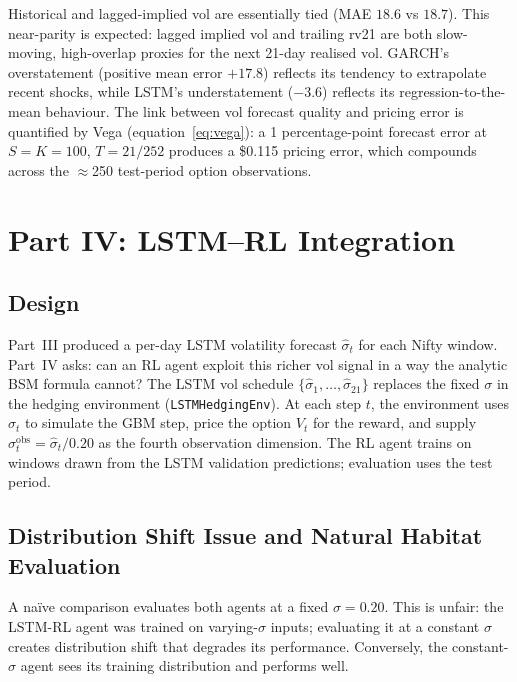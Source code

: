 \documentclass[12pt,a4paper]{article}
\begin{document}
Historical and lagged-implied vol are essentially tied (MAE $18.6$ vs $18.7$).
This near-parity is expected: lagged implied vol and trailing rv21 are both
slow-moving, high-overlap proxies for the next 21-day realised vol.  GARCH's
overstatement (positive mean error $+17.8$) reflects its tendency to
extrapolate recent shocks, while LSTM's understatement ($-3.6$) reflects
its regression-to-the-mean behaviour.  The link between vol forecast quality
and pricing error is quantified by Vega (equation~\eqref{eq:vega}): a
1 percentage-point forecast error at $S=K=100$, $T=21/252$ produces a
\$0.115 pricing error, which compounds across the $\approx$250 test-period
option observations.

\section{Part IV: LSTM--RL Integration}
\label{sec:integration}

\subsection{Design}

Part~III produced a per-day LSTM volatility forecast $\hat\sigma_t$ for each
Nifty window.  Part~IV asks: can an RL agent exploit this richer vol signal in
a way the analytic BSM formula cannot?  The LSTM vol schedule
$\{\hat\sigma_1,\ldots,\hat\sigma_{21}\}$ replaces the
fixed $\sigma$ in the hedging environment (\texttt{LSTMHedgingEnv}).  At each
step $t$, the environment uses $\hat\sigma_t$ to simulate the GBM step,
price the option $V_t$ for the reward, and supply $\sigma_t^{\mathrm{obs}} =
\hat\sigma_t/0.20$ as the fourth observation dimension.  The RL agent trains on
windows drawn from the LSTM validation predictions; evaluation uses the test
period.

\subsection{Distribution Shift Issue and Natural Habitat Evaluation}

A na\"{i}ve comparison evaluates both agents at a fixed $\sigma=0.20$.
This is unfair: the LSTM-RL agent was trained on varying-$\sigma$ inputs;
evaluating it at a constant $\sigma$ creates distribution shift that degrades
its performance.  Conversely, the constant-$\sigma$ agent sees its training
distribution and performs well.
\end{document}
